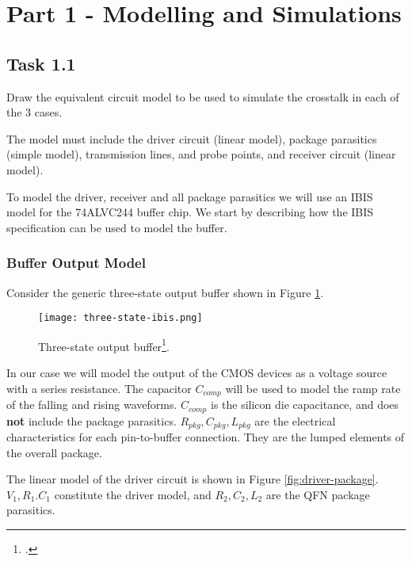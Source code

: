 \documentclass[../main.tex]{subfiles}
\begin{document}
\section{Part 1 - Modelling and Simulations}

\subsection{Task 1.1}

Draw the equivalent circuit model to be used to simulate the crosstalk in each of the 3 cases.

\vspace{10pt}
The model must include the driver circuit (linear model), package parasitics (simple model), transmission lines, and probe points, and receiver circuit (linear model).

\solution

To model the driver, receiver and all package parasitics we will use an IBIS model for the 74ALVC244 buffer chip. We start by describing how the IBIS specification can be used to model the buffer. 

\subsubsection{Buffer Output Model}

Consider the generic three-state output buffer shown in Figure \ref{fig:ibis-buffer}.

\begin{figure}[h]
    \centering
    \texttt{[image: three-state-ibis.png]}
    \caption{Three-state output buffer\footcite{ibis}.}
    \label{fig:ibis-buffer}
\end{figure}

In our case we will model the output of the CMOS devices as a voltage source with a series resistance. The capacitor $C_{comp}$ will be used to model the ramp rate of the falling and rising waveforms. $C_{comp}$ is the silicon die capacitance, and does \textbf{not} include the package parasitics. $R_{pkg}, C_{pkg}, L_{pkg}$ are the electrical characteristics for each pin-to-buffer connection. They are the lumped elements of the overall package.

\vspace{10pt}
The linear model of the driver circuit is shown in Figure \ref{fig:driver-package}. $V_1, R_1. C_1$ constitute the driver model, and $R_2, C_2, L_2$ are the QFN package parasitics.
\end{document}
